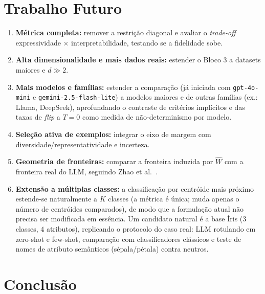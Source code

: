 \documentclass[12pt,a4paper]{article}
\newcommand{\West}{\ensuremath{\hat{W}}}   %
\begin{document}
\section{Trabalho Futuro}
\label{sec:futuro}

\begin{enumerate}
  \item \textbf{Métrica completa:} remover a restrição diagonal e avaliar o \emph{trade-off}
    expressividade $\times$ interpretabilidade, testando se a fidelidade sobe.
  \item \textbf{Alta dimensionalidade e mais dados reais:} estender o Bloco 3 a datasets
    maiores e $d \gg 2$.
  \item \textbf{Mais modelos e famílias:} estender a comparação (já iniciada com
    \texttt{gpt-4o-mini} e \texttt{gemini-2.5-flash-lite}) a modelos maiores e de outras
    famílias (ex.: Llama, DeepSeek), aprofundando o contraste de critérios implícitos e das
    taxas de \emph{flip} a $T=0$ como medida de não-determinismo por modelo.
  \item \textbf{Seleção ativa de exemplos:} integrar o eixo de margem
    \cite{minRethinkingRole2022} com diversidade/representatividade
    \cite{suSelectiveAnnotation2023} e incerteza.
  \item \textbf{Geometria de fronteiras:} comparar a fronteira induzida por \West{} com a
    fronteira real do LLM, seguindo Zhao et al.~\cite{zhaoProbing2024}.
  \item \textbf{Extensão a múltiplas classes:} a classificação por centróide mais próximo
    estende-se naturalmente a $K$ classes (a métrica é única; muda apenas o número de
    centróides comparados), de modo que a formulação atual não precisa ser modificada em
    essência. Um candidato natural é a base Íris ($3$ classes, $4$ atributos), replicando
    o protocolo do caso real: LLM rotulando em zero-shot e few-shot, comparação com
    classificadores clássicos e teste de nomes de atributo semânticos (sépala/pétala)
    contra neutros.
\end{enumerate}

\section{Conclusão}
\label{sec:conclusao}
\end{document}
